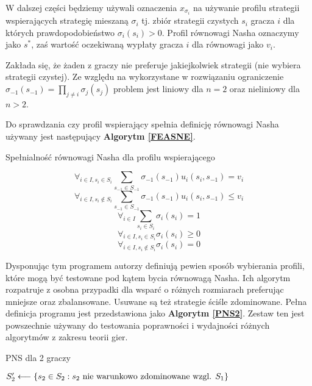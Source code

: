 \documentclass[polish]{standalone}
\begin{document}
W dalszej części będziemy używali oznaczenia $x_{\sigma_i}$ na używanie profilu strategii wspierających strategię
mieszaną $\sigma_i$ tj. zbiór strategii czystych $s_i$ gracza $i$ dla których prawdopodobieństwo $\sigma_i(s_i) > 0$.
Profil równowagi Nasha oznaczymy jako $s^{*}$, zaś wartość oczekiwaną wypłaty gracza $i$ dla równowagi jako $v_i$.

Zakłada się, że żaden z graczy nie preferuje jakiejkolwiek strategii (nie wybiera strategii czystej). Ze względu na
wykorzystane w rozwiązaniu ograniczenie $\sigma_{-1}(s_{-1}) = \prod_{j \ne i} \sigma_j(s_j)$ problem jest liniowy
dla $n = 2$ oraz nieliniowy dla $n > 2$.

Do sprawdzania czy profil wspierający spełnia definicję równowagi Nasha używany jest następujący \textbf{Algorytm
\ref{FEASNE}}.
\begin{algorithm}
\caption{Spełnialność równowagi Nasha dla profilu wspierającego}
\label{FEASNE}
\begin{algorithmic}
$$\forall_{i \in I, s_i \in S_i} \sum_{s_{-1} \in S_{-1}} \sigma_{-1}(s_{-1}) u_i(s_i, s_{-1}) = v_i$$
$$\forall_{i \in I, s_i \not\in S_i} \sum_{s_{-1} \in S_{-1}} \sigma_{-1}(s_{-1}) u_i(s_i, s_{-1}) \leq v_i$$
$$\forall_{i \in I} \sum_{s_i \in S_i} \sigma_i(s_i) = 1$$
$$\forall_{i \in I, s_i \in S_i} \sigma_i(s_i) \geq 0$$
$$\forall_{i \in I, s_i \not\in S_i} \sigma_i(s_i) = 0$$
\end{algorithmic}
\end{algorithm}

Dysponując tym programem autorzy definiują pewien sposób wybierania profili, które mogą być testowane pod kątem bycia
równowagą Nasha. Ich algorytm rozpatruje z osobna przypadki dla wsparć o różnych rozmiarach preferując mniejsze oraz
zbalansowane. Usuwane są też strategie ściśle zdominowane. Pełna definicja programu jest przedstawiona jako
\textbf{Algorytm \ref{PNS2}}. Zestaw ten jest powszechnie używany do testowania poprawności i wydajności różnych
algorytmów z zakresu teorii gier.

\begin{algorithm}
\caption{PNS dla 2 graczy}
\label{PNS2}
\begin{algorithmic}
  \STATE $S_2' \longleftarrow \{ s_2 \in S_2: s_2 \textrm{ nie warunkowo zdominowane wzgl. } S_1 \}$
      \ENDIF
    \ENDIF
   \ENDFOR
  \ENDIF
 \ENDFOR
\ENDFOR
\end{algorithmic}
\end{algorithm}
\end{document}
